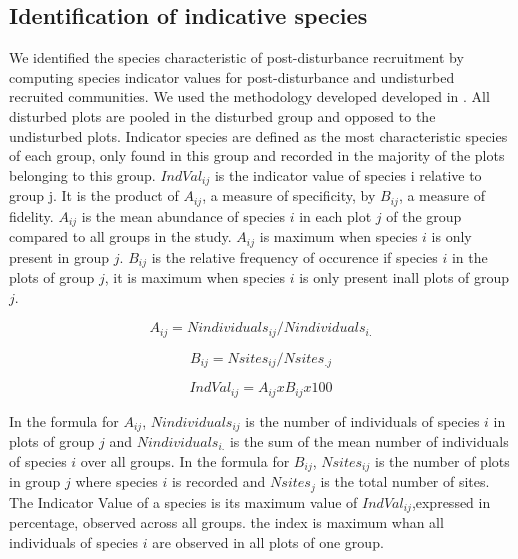 \documentclass[fleqn,10pt]{ArtEcoFoG} %
\begin{document}
\subsection{Identification of indicative
species}\label{identification-of-indicative-species}

We identified the species characteristic of post-disturbance recruitment
by computing species indicator values for post-disturbance and
undisturbed recruited communities. We used the methodology developed
developed in \citet{Dufrene1997}. All disturbed plots are pooled in the
disturbed group and opposed to the undisturbed plots. Indicator species
are defined as the most characteristic species of each group, only found
in this group and recorded in the majority of the plots belonging to
this group. \(IndVal_{ij}\) is the indicator value of species i relative
to group j. It is the product of \(A_{ij}\), a measure of specificity,
by \(B_{ij}\), a measure of fidelity. \(A_{ij}\) is the mean abundance
of species \(i\) in each plot \(j\) of the group compared to all groups
in the study. \(A_{ij}\) is maximum when species \(i\) is only present
in group \(j\). \(B_{ij}\) is the relative frequency of occurence if
species \(i\) in the plots of group \(j\), it is maximum when species
\(i\) is only present inall plots of group \(j\).

\begin{equation}
A_{ij} = Nindividuals_{ij} / Nindividuals_{i.}
\end{equation}

\begin{equation}
B_{ij} = Nsites_{ij} / Nsites_{.j}
\end{equation}

\begin{equation}
IndVal_{ij} = A_{ij} x B_{ij} x 100
\end{equation}

In the formula for \(A_{ij}\), \(Nindividuals_{ij}\) is the number of
individuals of species \(i\) in plots of group \(j\) and
\(Nindividuals_{i.}\) is the sum of the mean number of individuals of
species \(i\) over all groups. In the formula for \(B_{ij}\),
\(Nsites_{ij}\) is the number of plots in group \(j\) where species
\(i\) is recorded and \(Nsites_{j}\) is the total number of sites. The
Indicator Value of a species is its maximum value of
\(IndVal_{ij}\),expressed in percentage, observed across all groups. the
index is maximum whan all individuals of species \(i\) are observed in
all plots of one group.
\end{document}
